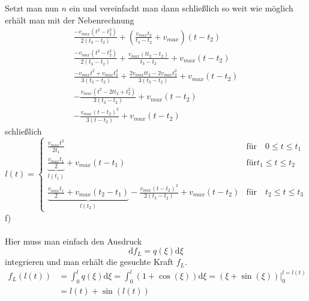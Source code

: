 Setzt man nun $n$ ein und vereinfacht man dann schließlich so weit wie möglich erhält man mit der Nebenrechnung
\begin{align*}
	\frac{-v_{max}(t^2 - t_2^2)}{2(t_3 - t_2)} + \left(\frac{v_{max}t_2}{t_3 - t_2} + v_{max}\right)(t - t_2) \\
	\frac{-v_{max}(t^2 - t_2^2)}{2(t_3 - t_2)} + \frac{v_{max}(t t_2 - t_2)}{t_3 - t_2} + v_{max}(t - t_2) \\
	\frac{-v_{max}t^2 + v_{max}t_2^2}{3(t_3 - t_2)} + \frac{2v_{max}t t_2 - 2v_{max}t_2^2}{3(t_3 - t_2)} + v_{max}(t - t_2) \\
	-\frac{v_{max}(t^2 - 2tt_2 + t_2^2)}{3(t_3 - t_2)} + v_{max}(t - t_2) \\
	-\frac{v_{max}(t - t_2)^2}{3(t - t_2)} + v_{max}(t - t_2)
\end{align*}
\newpage
\noindent
schließlich
\[
	l(t) = \left\{
	\begin{array}{lll}
	\frac{v_{max}t^2}{2t_1} & \text{für} \quad 0 \leq t \leq t_1 \\
	\underbrace{\frac{v_{max}t_1}{2}}_{l(t_1)} + v_{max}(t - t_1) & \text{für} t_1 \leq t \leq t_2 \\
	\underbrace{\frac{v_{max}t_1}{2} + v_{max}(t_2 - t_1)}_{l(t_2)} - \frac{v_{max}(t- t_2)^2}{2(t_3 - t_2)} + v_{max}(t - t_2) & \text{für} \quad t_2 \leq t \leq t_3
	\end{array}
	\right.
\]
f) \\ \\
Hier muss man einfach den Ausdruck
\[
	\text{d}f_L = q(\xi)\text{d}\xi
\]
integrieren und man erhält die gesuchte Kraft $f_L$.
\begin{align*}
	f_L(l(t)) &= \int_{0}^{l} q(\xi) \text{d}\xi = \int_{0}^{l} (1 + \cos(\xi))\text{d}\xi = (\xi + \sin(\xi))|_0^{l = l(t)} \\
	&= l(t) + \sin(l(t))
\end{align*}